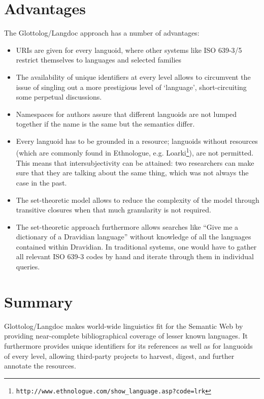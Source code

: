 \documentclass{llncs}
\begin{document}
\section{Advantages}
The Glottolog/Langdoc approach has a number of advantages:
\begin{itemize} 
 \item URIs are given for every languoid, where other systems like ISO 639-3/5 restrict themselves to languages and selected families
 \item The availability of unique identifiers at every level allows to circumvent the issue of singling out a more prestigious level of `language', short-circuiting some perpetual discussions.
 \item Namespaces for authors assure that different languoids are not lumped together if the name is the same but the semantics differ.
 \item Every languoid has to be grounded in a resource; languoids without resources (which are commonly found in Ethnologue, e.g. Loarki\footnote{\texttt{http://www.ethnologue.com/show_language.asp?code=lrk}}), are not permitted. This means that intersubjectivity can be attained: two researchers can make sure that they are talking about the same thing, which was not always the case in the past.
 \item The set-theoretic model allows to reduce the complexity of the model through transitive closures when that much granularity is not required.
 \item The set-theoretic approach furthermore allows searches like ``Give me a dictionary of a Dravidian language'' without knowledge of all the languages contained within Dravidian. In traditional systems, one would have to gather all relevant ISO 639-3 codes by hand and iterate through them in individual queries.
\end{itemize}

\section{Summary}
Glottolog/Langdoc makes world-wide linguistics fit for the Semantic Web by providing near-complete bibliographical coverage of lesser known languages. It furthermore provides unique identifiers for its references as well as for languoids of every level, allowing third-party projects to harvest, digest, and further annotate the resources.
 




 
\end{document}
